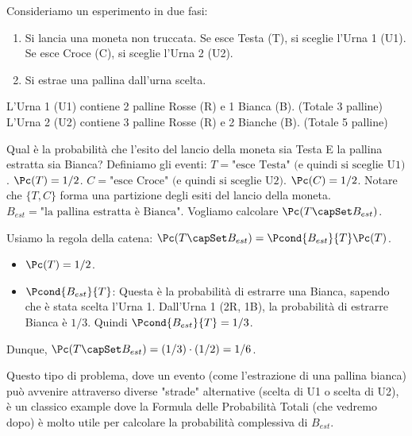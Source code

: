 \begin{example}
Consideriamo un esperimento in due fasi:
\begin{enumerate}
    \item Si lancia una moneta non truccata. Se esce Testa (T), si sceglie l'Urna 1 (U1). Se esce Croce (C), si sceglie l'Urna 2 (U2).
    \item Si estrae una pallina dall'urna scelta.
\end{enumerate}
L'Urna 1 (U1) contiene 2 palline Rosse (R) e 1 Bianca (B). (Totale 3 palline)
L'Urna 2 (U2) contiene 3 palline Rosse (R) e 2 Bianche (B). (Totale 5 palline)

Qual è la probabilità che l'esito del lancio della moneta sia Testa E la pallina estratta sia Bianca?
Definiamo gli eventi:
$T = \text{"esce Testa" (e quindi si sceglie U1)}$. $\Pc(T) = 1/2$.
$C = \text{"esce Croce" (e quindi si sceglie U2)}$. $\Pc(C) = 1/2$.
Notare che $\{T, C\}$ forma una partizione degli esiti del lancio della moneta.
$B_{est} = \text{"la pallina estratta è Bianca"}$.
Vogliamo calcolare $\Pc(T \capSet B_{est})$.

Usiamo la regola della catena: $\Pc(T \capSet B_{est}) = \Pcond{B_{est}}{T} \Pc(T)$.
\begin{itemize}
    \item $\Pc(T) = 1/2$.
    \item $\Pcond{B_{est}}{T}$: Questa è la probabilità di estrarre una Bianca, sapendo che è stata scelta l'Urna 1. Dall'Urna 1 (2R, 1B), la probabilità di estrarre Bianca è $1/3$. Quindi $\Pcond{B_{est}}{T} = 1/3$.
\end{itemize}
Dunque, $\Pc(T \capSet B_{est}) = (1/3) \cdot (1/2) = 1/6$.

Questo tipo di problema, dove un evento (come l'estrazione di una pallina bianca) può avvenire attraverso diverse "strade" alternative (scelta di U1 o scelta di U2), è un classico example dove la Formula delle Probabilità Totali (che vedremo dopo) è molto utile per calcolare la probabilità complessiva di $B_{est}$.
\end{example}

